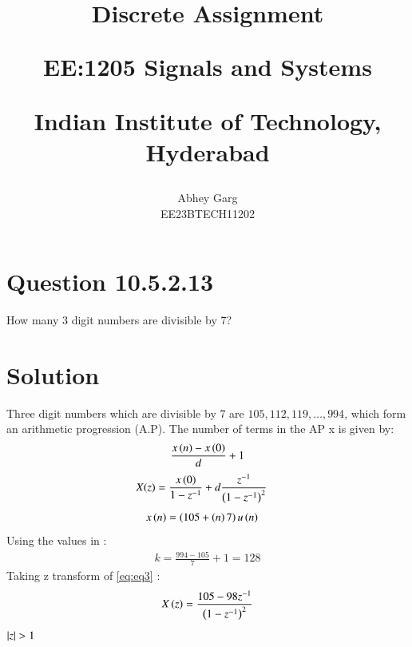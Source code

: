 \documentclass[journal,12pt,twocolumn]{IEEEtran}
\theoremstyle{remark}
\begin{document}
%




\vspace{3cm}

\title{
Discrete Assignment 

\large{EE:1205 Signals and Systems}

Indian Institute of Technology, Hyderabad
}
\author{Abhey Garg

EE23BTECH11202
}	


\maketitle

\newpage


\bigskip

\renewcommand{\thefigure}{\arabic{figure}}
\renewcommand{\thetable}{\arabic{table}}
\renewcommand{\theequation}{\arabic{equation}}

\section{Question 10.5.2.13}
How many 3 digit numbers are divisible by 7?
\section{Solution}




Three digit numbers which are divisible by 7 are \(105, 112, 119, \ldots, 994\), which form an arithmetic progression (A.P). 
The number of terms in the AP x is given by: 
\begin{align}  \label{eq:eq1}
    \frac{x\left(n\right) - x\left(0\right)}{d}  + 1
\end{align}
\begin{align}
    &X(z) = \frac{x\left(0\right)}{1 - z^{-1}} + d\frac{z^{-1}}{\left(1-z^{-1}\right)^2} \label{eq:eq2}
\end{align}
\begin{align}
x\left(n\right) &= \left(105 + \left(n\right)7\right)u\left(n\right)
\label{eq:eq3}
\end{align}
Using the values in  :
\begin{align}
    k = \frac{994 - 105}{7} + 1 = 128
\end{align}
Taking z transform of \eqref{eq:eq3} :
\begin{align}
 X\left(z\right) = \frac{105 - 98z^{-1}}{\left(1-z^{-1}\right)^2}
\end{align}
\quad $\left\vert z\right\vert > 1$
\end{document}
